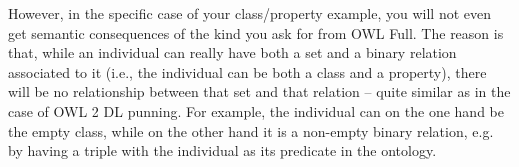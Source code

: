 \begin{deprecated}
However, in the specific case of your class/property example, you will not
even get semantic consequences of the kind you ask for from OWL Full. The
reason is that, while an individual can really have both a set and a binary
relation associated to it (i.e., the individual can be both a class and a
property), there will be no relationship between that set and that relation --
quite similar as in the case of OWL 2 DL punning. For example, the individual
can on the one hand be the empty class, while on the other hand it is a
non-empty binary relation, e.g. by having a triple with the individual as its
predicate in the ontology.
\end{deprecated}
